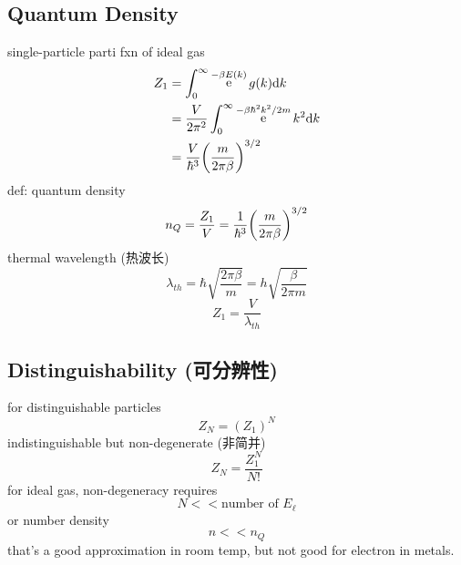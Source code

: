 \documentclass[UTF8]{ctexart} %
\DeclareMathOperator{\intinf}{\int_0^\infty}
\DeclareMathOperator{\e}{\mathrm{e}}
\numberwithin{equation}{subsection}
\begin{document}
\subsection{Quantum Density}
single-particle parti fxn of ideal gas
\begin{equation}\label{key}
\begin{aligned}
Z_1 &= \intinf\e^{-\beta E(k)}g(k)\dd k\\
&= \dfrac{V}{2\pi^2}\intinf \e^{-\beta\hbar^2 k^2/2m}k^2\dd k\\
&= \dfrac{V}{\hbar^3}\qty(\dfrac{m}{2\pi\beta})^{3/2}
\end{aligned}
\end{equation}
def: quantum density
\begin{equation}\label{key}
n_Q = \dfrac{Z_1}{V} = \dfrac{1}{\hbar^3}\qty(\dfrac{m}{2\pi\beta})^{3/2}
\end{equation}
thermal wavelength (热波长)
\begin{equation}\label{key}
\lambda_{th} = \hbar\sqrt{\dfrac{2\pi\beta}{m}} = h\sqrt{\dfrac{\beta}{2\pi m}}
\end{equation}
\begin{equation}\label{key}
Z_1 = \dfrac{V}{\lambda_{th}}
\end{equation}

\subsection{Distinguishability (可分辨性)}
for distinguishable particles
\begin{equation}\label{key}
Z_N = (Z_1)^N
\end{equation}
indistinguishable but non-degenerate (非简并)
\begin{equation}\label{key}
Z_N = \dfrac{Z_1^N}{N!}
\end{equation}
for ideal gas, non-degeneracy requires
\begin{equation}\label{key}
N << \text{number of }E_\ell
\end{equation}
or number density
\begin{equation}\label{key}
n << n_Q
\end{equation}
that's a good approximation in room temp, but not good for electron in metals.
\end{document}
